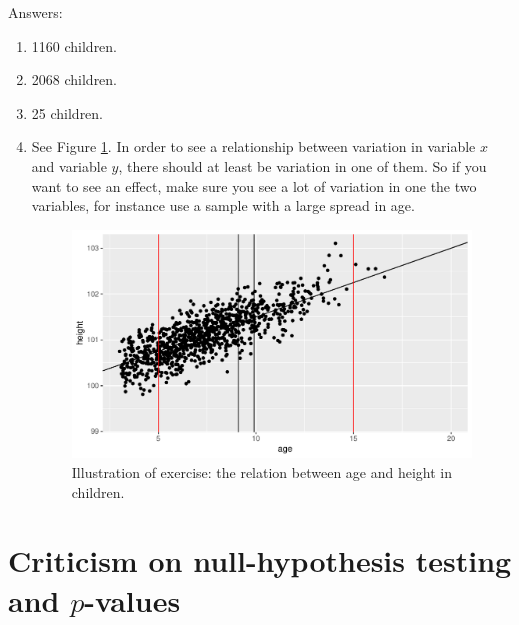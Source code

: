 \documentclass[]{book}\usepackage[]{graphicx}\usepackage[]{color}
\makeatletter
\def\maxwidth{ %
  \ifdim\Gin@nat@width>\linewidth
    \linewidth
  \else
    \Gin@nat@width
  \fi
}
\newenvironment{knitrout}{}{} %
\makeatother
\begin{document}
Answers:
\begin{enumerate}

\item 1160 children.

\item 2068 children.

\item 25 children.


\item See Figure \ref{fig:bla}. In order to see a relationship between variation in variable $x$ and variable $y$, there should at least be variation in one of them. So if you want to see an effect, make sure you see a lot of variation in one the two variables, for instance use a sample with a large spread in age.

\begin{knitrout}
\color{fgcolor}\begin{figure}

{\centering \includegraphics[width=\maxwidth]{figure/bla-1} 

}

\caption[Illustration of exercise]{Illustration of exercise: the relation between age and height in children.}\label{fig:bla}
\end{figure}


\end{knitrout}




\end{enumerate}


\section{Criticism on null-hypothesis testing and $p$-values}
\end{document}
